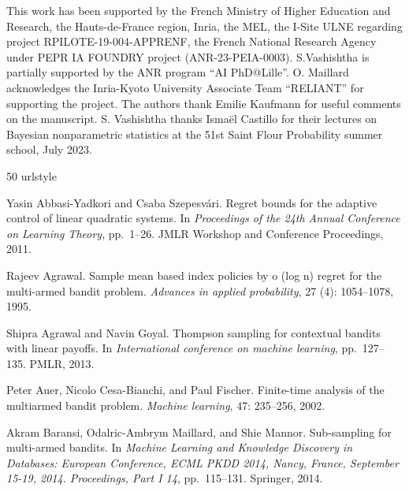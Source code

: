 \documentclass[10pt]{article}
\begin{document}
This work has been supported by the French Ministry of Higher Education and Research, the Hauts-de-France region, Inria, the MEL, the I-Site ULNE regarding project RPILOTE-19-004-APPRENF, the French National Research Agency under PEPR IA FOUNDRY project (ANR-23-PEIA-0003). S.Vashishtha is partially supported by the ANR program “AI PhD@Lille”. O. Maillard acknowledges the Inria-Kyoto University Associate Team “RELIANT” for supporting the project. The authors thank Emilie Kaufmann for useful comments on the manuscript. S. Vashishtha thanks Isma{\"e}l Castillo for their lectures on Bayesian nonparametric statistics at the  51st Saint Flour Probability summer school, July 2023.

%
%

\begin{thebibliography}{50}
\providecommand{\natexlab}[1]{#1}
\providecommand{\url}[1]{\texttt{#1}}
\expandafter\ifx\csname urlstyle\endcsname\relax
  \providecommand{\doi}[1]{DOI: #1}\else
  \providecommand{\doi}{DOI: \begingroup \urlstyle{rm}\Url}\fi

Yasin Abbasi-Yadkori and Csaba Szepesv{\'a}ri.
\newblock Regret bounds for the adaptive control of linear quadratic systems.
\newblock In \emph{Proceedings of the 24th Annual Conference on Learning Theory}, pp.\  1--26. JMLR Workshop and Conference Proceedings, 2011.

Rajeev Agrawal.
\newblock Sample mean based index policies by o (log n) regret for the multi-armed bandit problem.
\newblock \emph{Advances in applied probability}, 27 (4): 1054--1078, 1995.

Shipra Agrawal and Navin Goyal.
\newblock Thompson sampling for contextual bandits with linear payoffs.
\newblock In \emph{International conference on machine learning}, pp.\  127--135. PMLR, 2013.

Peter Auer, Nicolo Cesa-Bianchi, and Paul Fischer.
\newblock Finite-time analysis of the multiarmed bandit problem.
\newblock \emph{Machine learning}, 47: 235--256, 2002.

Akram Baransi, Odalric-Ambrym Maillard, and Shie Mannor.
\newblock Sub-sampling for multi-armed bandits.
\newblock In \emph{Machine Learning and Knowledge Discovery in Databases: European Conference, ECML PKDD 2014, Nancy, France, September 15-19, 2014. Proceedings, Part I 14}, pp.\  115--131. Springer, 2014.


\end{thebibliography}
\end{document}
